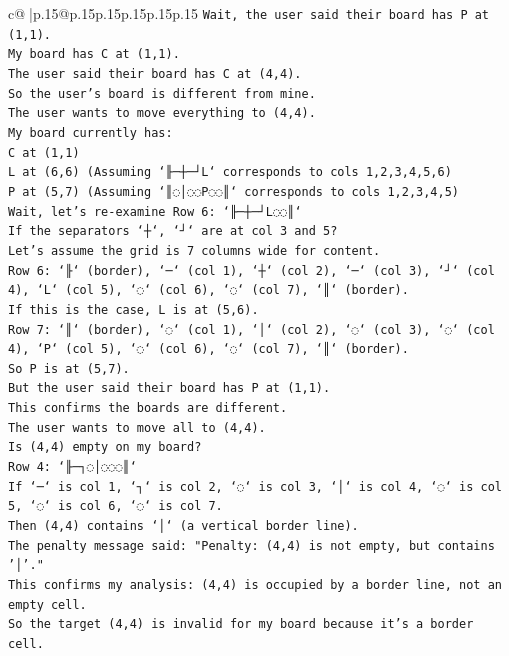 \documentclass{article}
\begin{document}
{\begin{supertabular}{c@{$\;$}|p{.15\linewidth}@{}p{.15\linewidth}p{.15\linewidth}p{.15\linewidth}p{.15\linewidth}p{.15\linewidth}}
{{{\texttt{Wait, the user said their board has P at (1,1).} \\
\texttt{My board has C at (1,1).} \\
\texttt{The user said their board has C at (4,4).} \\
\texttt{So the user's board is different from mine.} \\
\texttt{The user wants to move everything to (4,4).} \\
\texttt{My board currently has:} \\
\texttt{C at (1,1)} \\
\texttt{L at (6,6) (Assuming `╟─┼─┘L` corresponds to cols 1,2,3,4,5,6)} \\
\texttt{P at (5,7) (Assuming `║◌│◌◌P◌◌║` corresponds to cols 1,2,3,4,5)} \\
\texttt{Wait, let's re{-}examine Row 6: `╟─┼─┘L◌◌║`} \\
\texttt{If the separators `┼`, `┘` are at col 3 and 5?} \\
\texttt{Let's assume the grid is 7 columns wide for content.} \\
\texttt{Row 6: `╟` (border), `─` (col 1), `┼` (col 2), `─` (col 3), `┘` (col 4), `L` (col 5), `◌` (col 6), `◌` (col 7), `║` (border).} \\
\texttt{If this is the case, L is at (5,6).} \\
\texttt{Row 7: `║` (border), `◌` (col 1), `│` (col 2), `◌` (col 3), `◌` (col 4), `P` (col 5), `◌` (col 6), `◌` (col 7), `║` (border).} \\
\texttt{So P is at (5,7).} \\
\texttt{But the user said their board has P at (1,1).} \\
\texttt{This confirms the boards are different.} \\
\texttt{The user wants to move all to (4,4).} \\
\texttt{Is (4,4) empty on my board?} \\
\texttt{Row 4: `╟─┐◌│◌◌◌║`} \\
\texttt{If `─` is col 1, `┐` is col 2, `◌` is col 3, `│` is col 4, `◌` is col 5, `◌` is col 6, `◌` is col 7.} \\
\texttt{Then (4,4) contains `│` (a vertical border line).} \\
\texttt{The penalty message said: "Penalty: (4,4) is not empty, but contains '│'."} \\
\texttt{This confirms my analysis: (4,4) is occupied by a border line, not an empty cell.} \\
\texttt{So the target (4,4) is invalid for my board because it's a border cell.} \\
}}}
\end{supertabular}}
\end{document}
